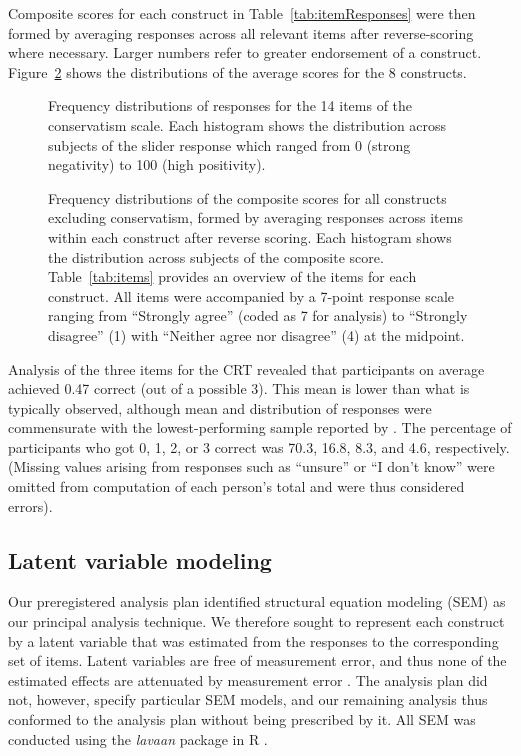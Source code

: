\documentclass[fignum,man]{apa}\usepackage[]{graphicx}\usepackage[]{color}
\begin{document}
Composite scores for each construct in Table~\ref{tab:itemResponses}
 were then formed by averaging 
responses across
all relevant items after reverse-scoring where necessary. 
Larger numbers refer to greater endorsement of a construct. 
Figure~\ref{fig:histoSocDarw} shows the distributions 
of the average scores for the 8 constructs. 
\begin{figure}[tp] %
	\caption{Frequency distributions of responses for the
		14 items of the conservatism scale.
		Each histogram shows the distribution
		across subjects of the slider response which
		ranged from 0 (strong negativity) to 100 (high positivity). }
	\label{fig:slidersSocDarw}
\end{figure}

\begin{figure}[tp] %
	\caption{Frequency distributions of the composite scores for all constructs
		excluding conservatism,
		formed by averaging responses across items within each construct 
		after
		reverse scoring. Each histogram shows the distribution
		across subjects of the composite score. 		
		Table~\ref{tab:items} provides an overview of the items for
		each construct. All items were accompanied by a 7-point 
		response scale ranging 
		from ``Strongly agree'' (coded as 7 for analysis) to
		 ``Strongly disagree'' (1) with ``Neither agree nor disagree'' (4)
		at the midpoint. }
	\label{fig:histoSocDarw}
\end{figure}

Analysis of the three items for the CRT revealed that participants on average
achieved 0.47 correct (out of a possible 3).
This mean is lower than what is typically observed, although
mean and distribution of responses were commensurate with the lowest-performing
sample reported by .
The percentage of participants who got 0, 1, 2, or 3 correct was 
70.3, 16.8, 8.3,
and 4.6, respectively. (Missing values
arising from responses such as ``unsure'' or ``I don't know'' were omitted from computation
of each person's total and were thus considered errors).

\subsection{Latent variable modeling}
Our
preregistered analysis plan identified structural equation modeling (SEM)
as our principal analysis technique. 
We therefore sought to represent each construct by a 
latent variable that was estimated from the 
responses to the corresponding set of items. 
Latent variables are free of measurement error, and thus none of the estimated effects 
are attenuated by measurement error \cite{Coffman05}. 
The analysis plan did not, however, 
specify particular SEM models, and our 
remaining analysis 
thus conformed to the analysis plan without being 
 prescribed by it.
 All SEM was conducted using the \textit{lavaan} package in R \cite{Rosseel12}.
\end{document}
